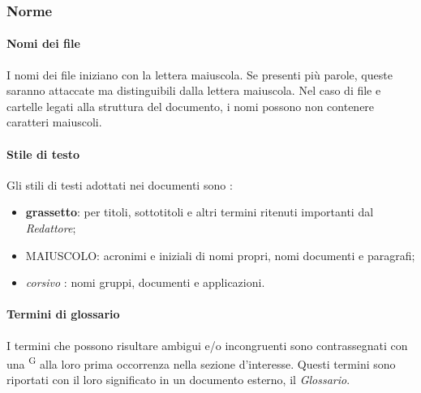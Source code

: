 \subsubsection{Norme}
\paragraph{Nomi dei file}
I nomi dei file iniziano con la lettera maiuscola. Se presenti più parole, queste saranno attaccate ma distinguibili dalla lettera maiuscola. Nel caso di file e cartelle legati alla struttura del documento, i nomi possono non contenere caratteri maiuscoli.

\paragraph{Stile di testo}
Gli stili di testi adottati nei documenti sono :
\begin{itemize}
\item \textbf{grassetto}: per titoli, sottotitoli e altri termini ritenuti importanti dal \textit{Redattore};
\item MAIUSCOLO: acronimi e iniziali di nomi propri, nomi documenti e paragrafi;
\item \textit{corsivo} : nomi gruppi, documenti e applicazioni.
\end{itemize}


\paragraph{Termini di glossario}
I termini che possono risultare ambigui e/o incongruenti sono contrassegnati con una \textsuperscript{G} alla loro prima occorrenza nella sezione d’interesse. Questi termini sono riportati con il loro significato in un documento esterno, il \textit{Glossario}.

